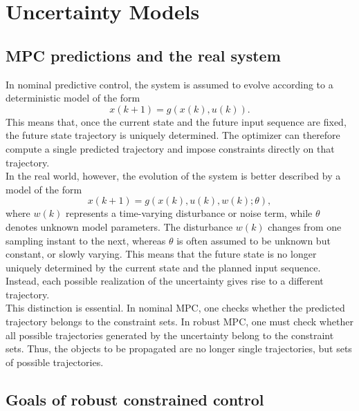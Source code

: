 \section{Uncertainty Models}

\subsection{MPC predictions and the real system}

In nominal predictive control, the system is assumed to evolve according to a deterministic model
of the form
\[
    x(k+1) = g(x(k),u(k)).
\]
This means that, once the current state and the future input sequence are fixed, the future state
trajectory is uniquely determined. The optimizer can therefore compute a single predicted
trajectory and impose constraints directly on that trajectory.\\
In the real world, however, the evolution of the system is better described by a model of the
form
\[
    x(k+1) = g(x(k),u(k),w(k);\theta),
\]
where \(w(k)\) represents a time-varying disturbance or noise term, while \(\theta\) denotes
unknown model parameters. The disturbance \(w(k)\) changes from one sampling instant to the
next, whereas \(\theta\) is often assumed to be unknown but constant, or slowly varying. This
means that the future state is no longer uniquely determined by the current state and the planned
input sequence. Instead, each possible realization of the uncertainty gives rise to a different
trajectory.\\

This distinction is essential. In nominal MPC, one checks whether the predicted trajectory belongs
to the constraint sets. In robust MPC, one must check whether all possible trajectories generated
by the uncertainty belong to the constraint sets. Thus, the objects to be propagated are no longer
single trajectories, but sets of possible trajectories.

\subsection{Goals of robust constrained control}

